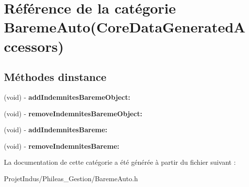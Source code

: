 \hypertarget{category_bareme_auto_07_core_data_generated_accessors_08}{}\section{Référence de la catégorie Bareme\+Auto(Core\+Data\+Generated\+Accessors)}
\label{category_bareme_auto_07_core_data_generated_accessors_08}
\subsection*{Méthodes d\textquotesingle{}instance}
\begin{DoxyCompactItemize}
\item 
\hypertarget{category_bareme_auto_07_core_data_generated_accessors_08_a90a3c937866419653659f4c25d64c1e9}{}(void) -\/ {\bfseries add\+Indemnites\+Bareme\+Object\+:}\label{category_bareme_auto_07_core_data_generated_accessors_08_a90a3c937866419653659f4c25d64c1e9}

\item 
\hypertarget{category_bareme_auto_07_core_data_generated_accessors_08_a74fdfbb37e59ec1ff9eb5e1bca72f12a}{}(void) -\/ {\bfseries remove\+Indemnites\+Bareme\+Object\+:}\label{category_bareme_auto_07_core_data_generated_accessors_08_a74fdfbb37e59ec1ff9eb5e1bca72f12a}

\item 
\hypertarget{category_bareme_auto_07_core_data_generated_accessors_08_a12e912c1fd62b9c012c3fcb6926a02ad}{}(void) -\/ {\bfseries add\+Indemnites\+Bareme\+:}\label{category_bareme_auto_07_core_data_generated_accessors_08_a12e912c1fd62b9c012c3fcb6926a02ad}

\item 
\hypertarget{category_bareme_auto_07_core_data_generated_accessors_08_a7064024cb0ba4de064465621f05a12ff}{}(void) -\/ {\bfseries remove\+Indemnites\+Bareme\+:}\label{category_bareme_auto_07_core_data_generated_accessors_08_a7064024cb0ba4de064465621f05a12ff}

\end{DoxyCompactItemize}


La documentation de cette catégorie a été générée à partir du fichier suivant \+:\begin{DoxyCompactItemize}
\item 
Projet\+Indus/\+Phileas\+\_\+\+Gestion/Bareme\+Auto.\+h\end{DoxyCompactItemize}
